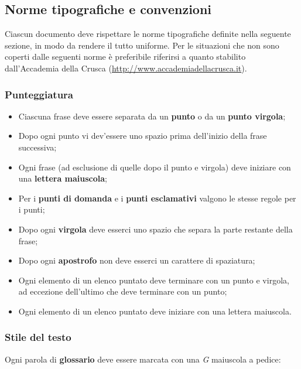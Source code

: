 \subsection{Norme tipografiche e convenzioni}

Ciascun documento deve rispettare le norme tipografiche definite nella seguente sezione, in modo da rendere il tutto uniforme. Per le situazioni che non sono coperti dalle seguenti norme è preferibile riferirsi a quanto stabilito dall'Accademia della Crusca (\url{http://www.accademiadellacrusca.it}).

	\subsubsection{Punteggiatura}
	
	\begin{itemize}

		\item Ciascuna frase deve essere separata da un \textbf{punto} o da un \textbf{punto virgola};
		\item Dopo ogni punto vi dev'essere uno spazio prima dell'inizio della frase successiva;
		\item Ogni frase (ad esclusione di quelle dopo il punto e virgola) deve iniziare con una \textbf{lettera maiuscola};
		\item Per i \textbf{punti di domanda} e i \textbf{punti esclamativi} valgono le stesse regole per i punti;
		\item Dopo ogni \textbf{virgola} deve esserci uno spazio che separa la parte restante della frase;
		\item Dopo ogni \textbf{apostrofo} non deve esserci un carattere di spaziatura;
		\item Ogni elemento di un elenco puntato deve terminare con un punto e virgola, ad eccezione dell'ultimo che deve terminare con un punto;
		\item Ogni elemento di un elenco puntato deve iniziare con una lettera maiuscola.
	
	\end{itemize}
	
	\subsubsection{Stile del testo}
	
	Ogni parola di \textbf{glossario} deve essere marcata con una \textit{G} maiuscola a pedice:
	\begin{center}
	\end{center}

